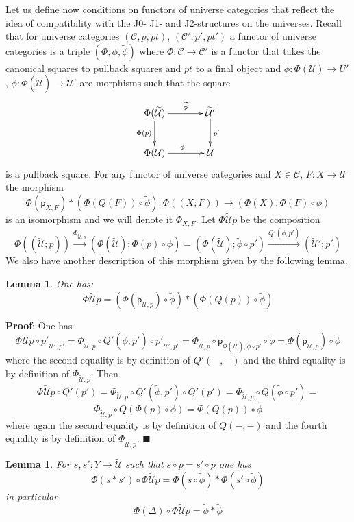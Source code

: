 \documentclass[12pt]{article}
\numberwithin{equation}{section}
\newenvironment{eq}{\begin{equation}}{\end{equation}}
\newenvironment{myproof}{{\bf Proof}:}{$\blacksquare$ \vskip 5mm }
\newtheorem{lemma}[proposition]{Lemma}
\newcommand{\llabel}[1]{\label{#1}}
\newcommand{\sr}{\rightarrow}
\newcommand{\lr}{\longrightarrow}
\newcommand{\wt}{\widetilde}
\newcommand{\p}{\mathsf{p}}
\newcommand{\U}{\mathcal{U}}
\begin{document}
Let us define now conditions on functors of universe categories that reflect
the idea of compatibility with the J0- J1- and J2-structures on the
universes. Recall that for universe categories $({\mathcal C},p,pt)$,
$({\mathcal C}',p',pt')$ a functor of universe categories is a triple
$(\Phi,\phi,\wt{\phi})$ where $\Phi:{\mathcal C}\sr {\mathcal C}'$ is a functor
that takes the canonical squares to pullback squares and $pt$ to a final object
and $\phi:\Phi(\U)\sr U'$, $\wt{\phi}:\Phi(\wt{\U})\sr \wt{\U}'$ are morphisms
such that the square
%
\begin{eq}\llabel{2015.04.06.eq10}
\begin{xy}
          \xymatrix@C=3pc{ \Phi(\wt{\U}) \ar[r]^-{\wt{\phi}} \ar[d]_{\Phi(p)} &
            \wt{\U}' \ar[d]^{p'}\\ \Phi(\U) \ar[r]^{\phi} & \U }
\end{xy}
\end{eq}
%
is a pullback square. For any functor of universe categories and $X\in{\mathcal
  C}$, $F:X\sr \U$ the morphism
%
$$\Phi(\p_{X,F})*(\Phi(Q(F))\circ\wt{\phi}):\Phi((X;F))\sr
(\Phi(X);\Phi(F)\circ\phi)$$
%
is an isomorphism and we will denote it $\Phi_{X,F}$. Let $\Phi\wt{\U}p$ be the
composition
%
$$\Phi((\wt{\U};p)) \stackrel{\Phi_{\wt{\U},p}}{\lr} (\Phi(\wt{\U});\Phi(p)\circ
\phi)=(\Phi(\wt{\U});\wt{\phi}\circ p')\stackrel{Q'(\wt{\phi},p')}{\lr}
(\wt{\U}';p')$$
%
We also have another description of this morphism given by the following lemma.
%
\begin{lemma}
\llabel{2015.04.10.l5} One has:
%
$$\Phi\wt{\U}p=(\Phi(\p_{\wt{\U},p})\circ\wt{\phi})*(\Phi(Q(p))\circ\wt{\phi})$$
%
\end{lemma}
%
\begin{myproof}
One has
%
$$\Phi\wt{\U}p\circ p'_{\wt{\U}',p'}=\Phi_{\wt{\U},p}\circ Q'(\wt{\phi},p')\circ
p'_{\wt{\U}',p'} =\Phi_{\wt{\U},p}\circ \p_{\Phi(\wt{\U}),\wt{\phi}\circ
  p'}\circ\wt{\phi}=\Phi(\p_{\wt{\U},p})\circ \wt{\phi}$$
%
where the second equality is by definition of $Q'(-,-)$ and the third equality
is by definition of $\Phi_{\wt{\U},p}$. Then
%
$$\Phi\wt{\U}p\circ Q'(p')=\Phi_{\wt{\U},p}\circ Q'(\wt{\phi},p')\circ
Q'(p')=\Phi_{\wt{\U},p}\circ Q(\wt{\phi}\circ p')=$$$$\Phi_{\wt{\U},p}\circ
Q(\Phi(p)\circ \phi)=\Phi(Q(p))\circ \wt{\phi}$$
%
where again the second equality is by definition of $Q(-,-)$ and the fourth
equality is by definition of $\Phi_{\wt{\U},p}$.
\end{myproof}
%
\begin{lemma}
\llabel{2015.04.10.l6} For $s,s':Y\sr \wt{\U}$ such that $s\circ p=s'\circ p$
one has
%
$$\Phi(s*s')\circ\Phi\wt{\U}p=\Phi(s\circ \wt{\phi})*\Phi(s'\circ\wt{\phi})$$
%
in particular
%
$$\Phi(\Delta)\circ \Phi\wt{\U}p = \wt{\phi}*\wt{\phi}$$
%
\end{lemma}
\end{document}
